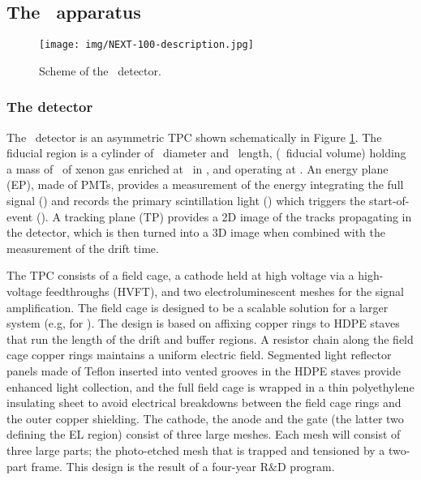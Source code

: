 \subsection{The \Next\ apparatus}
\label{sec.next100}

\begin{figure}[htbp!]
\centering
\texttt{[image: img/NEXT-100-description.jpg]}
\caption{\small Scheme of the \NEXT\ detector.}
\label{fig.next-100}
\end{figure}

\subsubsection{The detector}

The \Next\ detector is an asymmetric \HPXeEL TPC shown schematically in Figure \ref{fig.next-100}.  The fiducial region is a cylinder of \NextTpcDiameter\ diameter and \NextTpcLength\ length, (\NextFiducialVolume\ fiducial volume) holding a mass of \NextFiducialMass\ of xenon gas enriched at \XeEnrichment\ in \XE, and operating at \NextPressure.  An energy plane (EP),
made of PMTs, provides a measurement of the energy integrating the full signal (\stwo) and records the primary scintillation light (\sone) which triggers the start-of-event (\tz). A tracking plane (TP) provides a 2D image of the tracks propagating in the detector, which is then turned into a 3D image when combined with the measurement of the drift time.  

\indent

The TPC consists of a field cage, a cathode held at high voltage via a high-voltage feedthroughs (HVFT), and two electroluminescent meshes for the signal amplification.
The field cage is designed to be a scalable solution for a larger system (e.g, for \NHD).  The design is based on affixing copper rings to HDPE staves that run the length of the drift and buffer regions.  
A resistor chain along the field cage copper rings maintains a uniform electric field. Segmented light reflector panels made of Teflon inserted into vented grooves in the HDPE staves provide enhanced light collection, and the full field cage is wrapped in a thin polyethylene insulating sheet to avoid electrical breakdowns between the field cage rings and the outer copper shielding.
The cathode, the anode and the gate (the latter two defining the EL region) consist of three large meshes.  Each mesh will consist of three large parts; the photo-etched mesh that is trapped and tensioned by a two-part frame. This design is the result of a four-year R$\&$D program.

